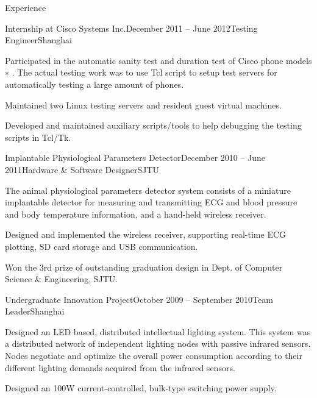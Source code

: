 \documentclass{resume} %
\begin{document}
\begin{rSection}{Experience}
\begin{rSubsection}{Internship at Cisco Systems Inc.}{December 2011 -- June 2012}{Testing Engineer}{Shanghai}
    \item Participated in the automatic sanity test and duration test of Cisco
        phone models$∗$ . The actual testing work was to use Tcl script to
        setup test servers for automatically testing a large amount of phones.

    \item Maintained two Linux testing servers and resident guest virtual
        machines.

    \item Developed and maintained auxiliary scripts/tools to help debugging
        the testing scripts in Tcl/Tk.

    \end{rSubsection}

    \begin{rSubsection}{Implantable Physiological Parameters Detector}{December 2010 -- June 2011}{Hardware \& Software Designer}{SJTU}

    \item The animal physiological parameters detector system consists of a
        miniature implantable detector for measuring and transmitting ECG and
        blood pressure and body temperature information, and a hand-held
        wireless receiver.

    \item Designed and implemented the wireless receiver, supporting real-time
        ECG plotting, SD card storage and USB communication.

    \item Won the 3rd prize of outstanding graduation design in Dept. of Computer
        Science \& Engineering, SJTU.

    \end{rSubsection}

    \begin{rSubsection}{Undergraduate Innovation Project}{October 2009 -- September 2010}{Team Leader}{Shanghai}

    \item Designed an LED based, distributed intellectual lighting system. This
        system was a distributed network of independent lighting nodes with
        passive infrared sensors. Nodes negotiate and optimize the overall
        power consumption according to their different lighting demands
        acquired from the infrared sensors.

    \item Designed an 100W current-controlled, bulk-type switching power
        supply.


\end{rSubsection}
\end{rSection}
\end{document}
